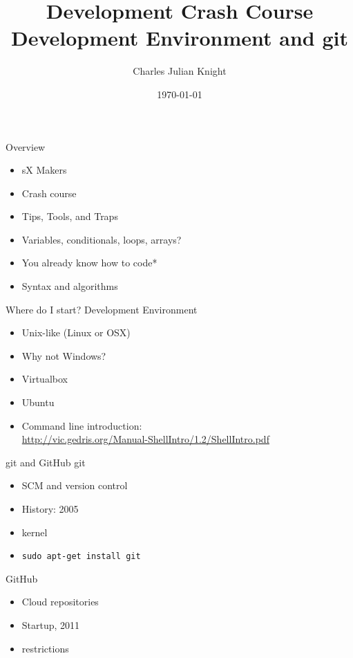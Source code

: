 \documentclass[mathserif]{beamer}
\title[sX Maker Crash Course]{Development Crash Course\\ \large Development Environment and git}
\author{Charles Julian Knight}
\institute{Startup Exchange - Georgia Tech}
\date{\today}
\begin{document}
\begin{frame}
\titlepage
\end{frame}

\begin{frame}{Overview}
\begin{itemize}
\item sX Makers
\item Crash course
\item Tips, Tools, and Traps
\item Variables, conditionals, loops, arrays?
\pause \item You already know how to code*
\item Syntax and algorithms
\end{itemize}
\end{frame}

\begin{frame}{Where do I start?}
Development Environment\\
\vspace{.5cm}
\begin{itemize}
\item Unix-like (Linux or OSX)
\item Why not Windows?
\item Virtualbox
\item Ubuntu
\item Command line introduction:\\ {\tiny \url{http://vic.gedris.org/Manual-ShellIntro/1.2/ShellIntro.pdf}}
\end{itemize}
\end{frame}

\begin{frame}{git and GitHub}
git\\
\begin{itemize}
\item SCM and version control
\item History: 2005
\item kernel
\item \texttt{sudo apt-get install git}
\end{itemize}
\vspace{.3in}
\pause
GitHub\\
\begin{itemize}
\item Cloud repositories
\item Startup, 2011
\item restrictions
\end{itemize}
\end{frame}
\end{document}
